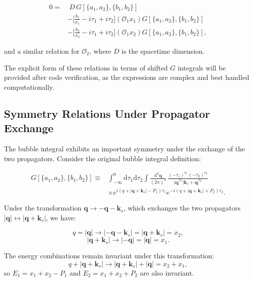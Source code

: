 \documentclass[a4paper,12pt]{article}
\def\di{{\mathrm{d}}}
\def\to{\rightarrow}
\begin{document}
\begin{align}
	0 = & \; D\, G[\{a_1,a_2\},\{b_1,b_2\}] \nonumber        \\
	    & - \Big[ \frac{b_1}{x_1} - i\tau_1 + i\tau_2 \Big]
	(\mathcal{O}_1 x_1) G[\{a_1,a_2\},\{b_1,b_2\}] \nonumber \\
	    & - \Big[ \frac{b_2}{x_2} - i\tau_1 + i\tau_2 \Big]
	(\mathcal{O}_1 x_2) G[\{a_1,a_2\},\{b_1,b_2\}],
\end{align}

and a similar relation for $\mathcal{O}_2$, where $D$ is the spacetime dimension.

The explicit form of these relations in terms of shifted $G$ integrals will be provided after code verification, as the expressions are complex and best handled computationally.

\subsection{Symmetry Relations Under Propagator Exchange}

The bubble integral exhibits an important symmetry under the exchange of the two propagators. Consider the original bubble integral definition:

\begin{equation}
	\begin{split}
		G[\{a_1,a_2\},\{b_1,b_2\}] \equiv & \int_{-\infty}^0 \di\tau_1\di\tau_2 \int \frac{\di^3\bm q}{(2\pi)^3} \,
		\frac{(-\tau_1)^{a_1}(-\tau_2)^{a_2}}{|\bm q|^{b_1}|\bm k_s+\bm q|^{b_2}}                                          \\
		                                  & \times e^{i(q+|\bm q+\bm k_s|-P_1)\tau_1} e^{-i(q+|\bm q+\bm k_s|+P_2)\tau_2}.
	\end{split}
\end{equation}

Under the transformation $\bm q \to -\bm q - \bm k_s$, which exchanges the two propagators $|\bm q| \leftrightarrow |\bm q+\bm k_s|$, we have:

\begin{equation}
	q = |\bm q| \to |-\bm q - \bm k_s| = |\bm q+\bm k_s| = x_2,
\end{equation}
\begin{equation}
	|\bm q+\bm k_s| \to |-\bm q| = |\bm q| = x_1.
\end{equation}

The energy combinations remain invariant under this transformation:
\begin{equation}
	q + |\bm q+\bm k_s| \to |\bm q+\bm k_s| + |\bm q| = x_2 + x_1,
\end{equation}
so $E_1 = x_1 + x_2 - P_1$ and $E_2 = x_1 + x_2 + P_2$ are also invariant.
\end{document}
